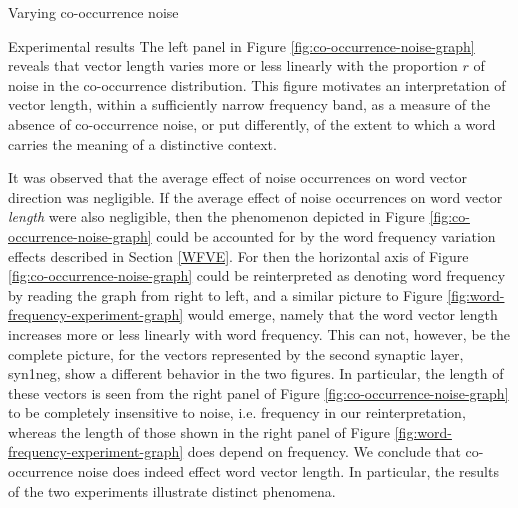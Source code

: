 \documentclass{article} %
\begin{document}
\begin{section}{Varying co-occurrence noise}
\begin{subsection}{Experimental results}
The left panel in Figure \ref{fig:co-occurrence-noise-graph} reveals that vector length varies more or less
linearly with the proportion $r$ of noise in the co-occurrence
distribution.  This figure motivates an interpretation of vector
length, within a sufficiently narrow frequency band, as a measure of the
absence of co-occurrence noise, or put differently, of the extent to
which a word carries the meaning of a distinctive context.

It was observed that the average effect of noise occurrences on word vector direction was negligible.
If the average effect of noise occurrences on word vector \textit{length} were also negligible, then the phenomenon depicted in Figure \ref{fig:co-occurrence-noise-graph} could be accounted for by the word frequency variation effects described in Section \ref{WFVE}.
For then the horizontal axis of Figure \ref{fig:co-occurrence-noise-graph} could be reinterpreted as
denoting word frequency by reading the graph from right to left,
and a similar picture to Figure \ref{fig:word-frequency-experiment-graph} would emerge, namely that the
word vector length increases more or less linearly with word frequency.
This can not, however, be the complete picture, for the vectors
represented by the second synaptic layer, syn1neg, show a different
behavior in the two figures.  In particular, the length of these vectors
is seen from the right panel of Figure \ref{fig:co-occurrence-noise-graph}
to be completely insensitive to noise, i.e. frequency in our
reinterpretation, whereas the length of those shown in the right panel
of Figure \ref{fig:word-frequency-experiment-graph} does depend on
frequency.
We conclude that co-occurrence noise does indeed effect word vector length.
In particular, the results of the two experiments illustrate distinct phenomena.



\end{subsection}
\end{section}
\end{document}
